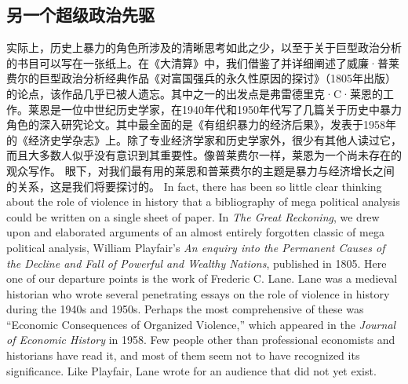 \subsection{另一个超级政治先驱}
\begin{paracol}{2}
实际上，历史上暴力的角色所涉及的清晰思考如此之少，以至于关于巨型政治分析的书目可以写在一张纸上。在《大清算》中，我们借鉴了并详细阐述了威廉·普莱费尔的巨型政治分析经典作品《对富国强兵的永久性原因的探讨》（1805年出版）的论点，该作品几乎已被人遗忘。其中之一的出发点是弗雷德里克·C·莱恩的工作。莱恩是一位中世纪历史学家，在1940年代和1950年代写了几篇关于历史中暴力角色的深入研究论文。其中最全面的是《有组织暴力的经济后果》，发表于1958年的《经济史学杂志》上。除了专业经济学家和历史学家外，很少有其他人读过它，而且大多数人似乎没有意识到其重要性。像普莱费尔一样，莱恩为一个尚未存在的观众写作。 眼下，对我们最有用的莱恩和普莱费尔的主题是暴力与经济增长之间的关系，这是我们将要探讨的。
\switchcolumn
In fact, there has been so little clear thinking about the role of violence in history that a bibliography of mega political analysis could be written on a single sheet of paper. In \emph{The Great Reckoning}, we drew upon and elaborated arguments of an almost entirely forgotten classic of mega political analysis, William Playfair's \emph{An enquiry into the Permanent Causes of the Decline and Fall of Powerful and Wealthy Nations}, published in 1805. Here one of our departure points is the work of Frederic C. Lane. Lane was a medieval historian who wrote several penetrating essays on the role of violence in history during the 1940s and 1950s. Perhaps the most comprehensive of these was ``Economic Consequences of Organized Violence,'' which appeared in the \emph{Journal of Economic History} in 1958. Few people other than professional economists and historians have read it, and most of them seem not to have recognized its significance. Like Playfair, Lane wrote for an audience that did not yet exist.
\end{paracol}

